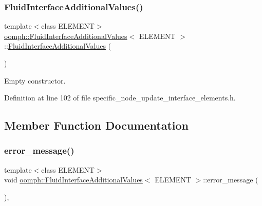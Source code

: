 \subsubsection{\texorpdfstring{Fluid\+Interface\+Additional\+Values()}{FluidInterfaceAdditionalValues()}}
{\footnotesize\ttfamily template$<$class E\+L\+E\+M\+E\+NT$>$ \\
\hyperlink{classoomph_1_1FluidInterfaceAdditionalValues}{oomph\+::\+Fluid\+Interface\+Additional\+Values}$<$ E\+L\+E\+M\+E\+NT $>$\+::\hyperlink{classoomph_1_1FluidInterfaceAdditionalValues}{Fluid\+Interface\+Additional\+Values} (\begin{DoxyParamCaption}{ }\end{DoxyParamCaption})\hspace{0.3cm}{\ttfamily [inline]}}



Empty constructor. 



Definition at line 102 of file specific\+\_\+node\+\_\+update\+\_\+interface\+\_\+elements.\+h.



\subsection{Member Function Documentation}
\mbox{\label{classoomph_1_1FluidInterfaceAdditionalValues_abcf9870977c827475d3ad4f5e9ec9ee9}} 
\subsubsection{\texorpdfstring{error\+\_\+message()}{error\_message()}}
{\footnotesize\ttfamily template$<$class E\+L\+E\+M\+E\+NT$>$ \\
void \hyperlink{classoomph_1_1FluidInterfaceAdditionalValues}{oomph\+::\+Fluid\+Interface\+Additional\+Values}$<$ E\+L\+E\+M\+E\+NT $>$\+::error\+\_\+message (\begin{DoxyParamCaption}{ }\end{DoxyParamCaption})\hspace{0.3cm}{\ttfamily [inline]}, {\ttfamily [private]}}



